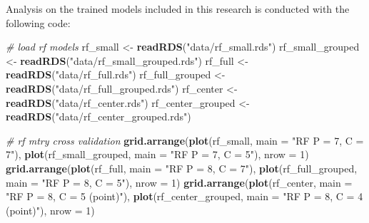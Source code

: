 \documentclass[12pt,twoside]{reedthesis}
\newenvironment{Shaded}{\begin{snugshade}}{\end{snugshade}}
\newcommand{\CommentTok}[1]{\textcolor[rgb]{0.56,0.35,0.01}{\textit{#1}}}
\newcommand{\DataTypeTok}[1]{\textcolor[rgb]{0.13,0.29,0.53}{#1}}
\newcommand{\DecValTok}[1]{\textcolor[rgb]{0.00,0.00,0.81}{#1}}
\newcommand{\KeywordTok}[1]{\textcolor[rgb]{0.13,0.29,0.53}{\textbf{#1}}}
\newcommand{\NormalTok}[1]{#1}
\newcommand{\StringTok}[1]{\textcolor[rgb]{0.31,0.60,0.02}{#1}}
\begin{document}
Analysis on the trained models included in this research is conducted with the following code:
\begin{Shaded}
\begin{Highlighting}[]
\CommentTok{# load rf models}
\NormalTok{rf_small <-}\StringTok{ }\KeywordTok{readRDS}\NormalTok{(}\StringTok{"data/rf_small.rds"}\NormalTok{)}
\NormalTok{rf_small_grouped <-}\StringTok{ }\KeywordTok{readRDS}\NormalTok{(}\StringTok{"data/rf_small_grouped.rds"}\NormalTok{)}
\NormalTok{rf_full <-}\StringTok{ }\KeywordTok{readRDS}\NormalTok{(}\StringTok{"data/rf_full.rds"}\NormalTok{)}
\NormalTok{rf_full_grouped <-}\StringTok{ }\KeywordTok{readRDS}\NormalTok{(}\StringTok{"data/rf_full_grouped.rds"}\NormalTok{)}
\NormalTok{rf_center <-}\StringTok{ }\KeywordTok{readRDS}\NormalTok{(}\StringTok{"data/rf_center.rds"}\NormalTok{)}
\NormalTok{rf_center_grouped <-}\StringTok{ }\KeywordTok{readRDS}\NormalTok{(}\StringTok{"data/rf_center_grouped.rds"}\NormalTok{)}

\CommentTok{# rf mtry cross validation}
\KeywordTok{grid.arrange}\NormalTok{(}\KeywordTok{plot}\NormalTok{(rf_small, }\DataTypeTok{main =} \StringTok{"RF P = 7, C = 7"}\NormalTok{),}
             \KeywordTok{plot}\NormalTok{(rf_small_grouped, }\DataTypeTok{main =} \StringTok{"RF P = 7, C = 5"}\NormalTok{), }\DataTypeTok{nrow =} \DecValTok{1}\NormalTok{)}
\KeywordTok{grid.arrange}\NormalTok{(}\KeywordTok{plot}\NormalTok{(rf_full, }\DataTypeTok{main =} \StringTok{"RF P = 8, C = 7"}\NormalTok{),}
             \KeywordTok{plot}\NormalTok{(rf_full_grouped, }\DataTypeTok{main =} \StringTok{"RF P = 8, C = 5"}\NormalTok{), }\DataTypeTok{nrow =} \DecValTok{1}\NormalTok{)}
\KeywordTok{grid.arrange}\NormalTok{(}\KeywordTok{plot}\NormalTok{(rf_center, }\DataTypeTok{main =} \StringTok{"RF P = 8, C = 5 (point)"}\NormalTok{),}
             \KeywordTok{plot}\NormalTok{(rf_center_grouped, }\DataTypeTok{main =} \StringTok{"RF P = 8, C = 4 (point)"}\NormalTok{), }
             \DataTypeTok{nrow =} \DecValTok{1}\NormalTok{)}


\end{Highlighting}
\end{Shaded}
\end{document}
